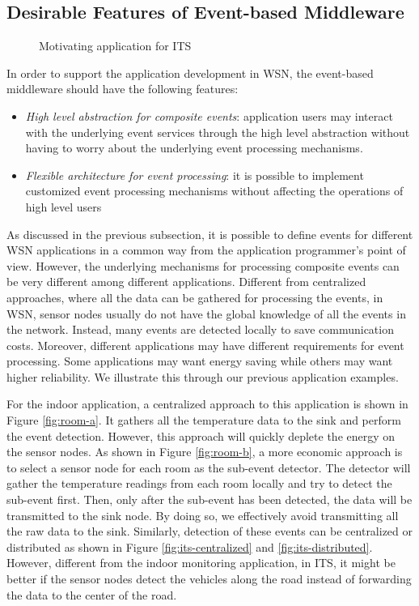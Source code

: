 \subsection{Desirable Features of Event-based Middleware}

\begin{figure}
\centering
{}
\caption{Motivating application for ITS}
\label{fig:its}
\end{figure}

In order to support the application development in WSN, the event-based middleware should have the following features:
\begin{itemize}
\item \emph{High level abstraction for composite events}: application users may interact with the underlying event services through the high level abstraction without having to worry about the underlying event processing mechanisms.
\item \emph{Flexible architecture for event processing}: it is possible to implement customized event processing mechanisms without affecting the operations of high level users
\end{itemize}

As discussed in the previous subsection, it is possible to define events for different WSN applications in a common way from the application programmer's point of view. However, the underlying mechanisms for processing composite events can be very different among different applications. Different from centralized approaches, where all the data can be gathered for processing the events, in WSN, sensor nodes usually do not have the global knowledge of all the events in the network. Instead, many events are detected locally to save communication costs. Moreover, different applications may have different requirements for event processing. Some applications may want energy saving while others may want higher reliability. We illustrate this through our previous application examples.

For the indoor application, a centralized approach to this application is shown in Figure \ref{fig:room-a}. It gathers all the temperature data to the sink and perform the event detection. However, this approach will quickly deplete the energy on the sensor nodes. As shown in Figure \ref{fig:room-b}, a more economic approach is to select a sensor node for each room as the sub-event detector. The detector will gather the temperature readings from each room locally and try to detect the sub-event first. Then, only after the sub-event has been detected, the data will be transmitted to the sink node. By doing so, we effectively avoid transmitting all the raw data to the sink. Similarly, detection of these events can be centralized or distributed as shown in Figure \ref{fig:its-centralized} and \ref{fig:its-distributed}. However, different from the indoor monitoring application, in ITS, it might be better if the sensor nodes detect the vehicles along the road instead of forwarding the data to the center of the road. 

